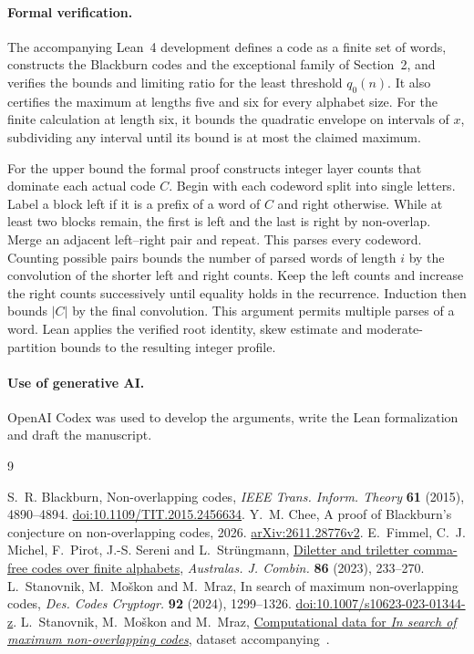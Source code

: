 \documentclass[11pt,a4paper]{article}
\begin{document}
\paragraph{Formal verification.}
The accompanying Lean~4 development defines a code as a finite set of words, constructs the Blackburn codes and the exceptional family of Section~2, and verifies the bounds and limiting ratio for the least threshold $q_0(n)$. It also certifies the maximum at lengths five and six for every alphabet size. For the finite calculation at length six, it bounds the quadratic envelope on intervals of $x$, subdividing any interval until its bound is at most the claimed maximum.

For the upper bound the formal proof constructs integer layer counts that dominate each actual code $C$. Begin with each codeword split into single letters. Label a block left if it is a prefix of a word of $C$ and right otherwise. While at least two blocks remain, the first is left and the last is right by non-overlap. Merge an adjacent left--right pair and repeat. This parses every codeword. Counting possible pairs bounds the number of parsed words of length $i$ by the convolution of the shorter left and right counts. Keep the left counts and increase the right counts successively until equality holds in the recurrence. Induction then bounds $|C|$ by the final convolution. This argument permits multiple parses of a word. Lean applies the verified root identity, skew estimate and moderate-partition bounds to the resulting integer profile.

\paragraph{Use of generative AI.}
OpenAI Codex was used to develop the arguments, write the Lean formalization and draft the manuscript.

\begin{thebibliography}{9}
\raggedright
{}
S.~R. Blackburn, Non-overlapping codes, \emph{IEEE Trans. Inform. Theory} \textbf{61} (2015), 4890--4894. \href{https://doi.org/10.1109/TIT.2015.2456634}{doi:10.1109/TIT.2015.2456634}.
Y.~M. Chee, A proof of Blackburn's conjecture on non-overlapping codes, 2026. \href{https://arxiv.org/abs/2611.28776v2}{arXiv:2611.28776v2}.
E.~Fimmel, C.~J. Michel, F.~Pirot, J.-S. Sereni and L.~Str\"ungmann, \href{https://ajc.maths.uq.edu.au/pdf/86/ajc_v86_p233.pdf}{Diletter and triletter comma-free codes over finite alphabets}, \emph{Australas. J. Combin.} \textbf{86} (2023), 233--270.
L.~Stanovnik, M.~Mo\v{s}kon and M.~Mraz, In search of maximum non-overlapping codes, \emph{Des. Codes Cryptogr.} \textbf{92} (2024), 1299--1326. \href{https://doi.org/10.1007/s10623-023-01344-z}{doi:10.1007/s10623-023-01344-z}.
L.~Stanovnik, M.~Mo\v{s}kon and M.~Mraz, \href{https://github.com/magdevska/nono-codes}{Computational data for \emph{In search of maximum non-overlapping codes}}, dataset accompanying~\cite{SMM}.
\end{thebibliography}
\end{document}
